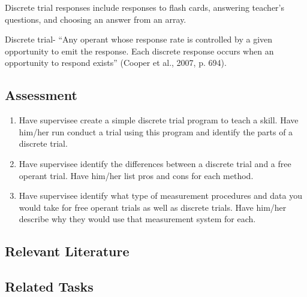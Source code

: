 Discrete trial responses include responses to flash cards, answering teacher's questions, and choosing an answer from an array. 

Discrete trial- ``Any operant whose response rate is controlled by a given opportunity to emit the response. Each discrete response occurs when an opportunity to respond exists'' (Cooper et al., 2007, p. 694).

\subsection{Assessment}
\begin{enumerate}
\item Have supervisee create a simple discrete trial program to teach a skill. Have him/her run conduct a trial using this program and identify the parts of a discrete trial.
\item Have supervisee identify the differences between a discrete trial and a free operant trial. Have him/her list pros and cons for each method.
\item Have supervisee identify what type of measurement procedures and data you would take for free operant trials as well as discrete trials. Have him/her describe why they would use that measurement system for each.
\end{enumerate}
%
\subsection{Relevant Literature}
\begin{refsection}
\nocite{test,alang2017police,clayton2018black}
\printbibliography[heading=none]
\end{refsection}
%
\subsection{Related Tasks}
\fouraOne{}\\
\fouraTwo{}\\
\fouraSeven{}\\
\fourdThree{}\\
\foureOne{}\\
\foureTwelve{}\\
\fourhOne{}\\
\fourFKTen{}\\
\fourFKEleven{}\\
\fourFKFourtySeven{}\\
%
%
%
%
%                   
%
%
